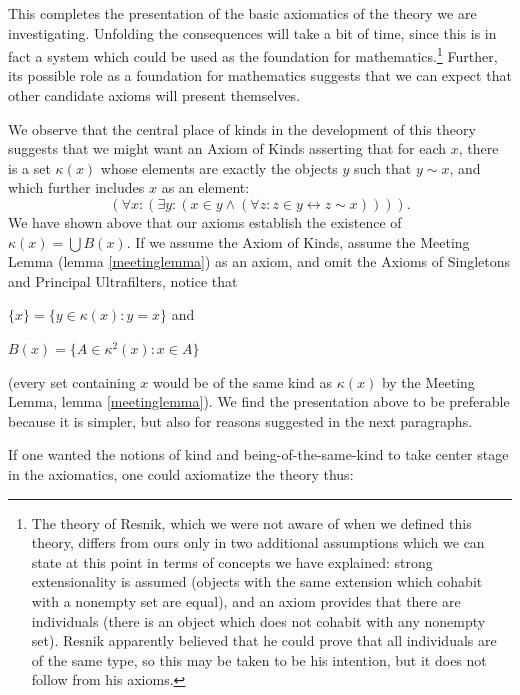 \documentclass[12pt]{article}
\begin{document}
This completes the presentation of the basic axiomatics of the theory we are investigating.  Unfolding the consequences will take a bit of time, since this is in fact a system which could be used as the foundation for mathematics.\footnote{The theory of Resnik, which we were not aware of when we defined this theory, differs from ours only in two additional assumptions which we can state at this point in terms of concepts we have explained:  strong extensionality is assumed (objects with the same extension which cohabit with a nonempty set are equal), and an axiom provides that there are individuals (there is an object which does not cohabit with any nonempty set).  Resnik apparently believed that he could prove that all individuals are of the same type, so this may be taken to be his intention, but it does not follow from his axioms.}  Further, its possible role as a foundation for mathematics suggests that we can expect that other candidate axioms will present themselves.

We observe that the central place of kinds in the development of this
theory suggests that we might want an Axiom of Kinds asserting that
for each $x$, there is a set $\kappa(x)$ whose elements are exactly
the objects $y$ such that $y \sim x$, and which further includes $x$
as an element: $$(\forall x:(\exists y:(x \in y \wedge (\forall z:z
\in y \leftrightarrow z \sim x)))).$$ We have shown above that our
axioms establish the existence of $\kappa(x) = \bigcup B(x)$.  If we
assume the Axiom of Kinds, assume the Meeting Lemma (lemma
\ref{meetinglemma}) as an axiom, and omit the Axioms of Singletons and
Principal Ultrafilters, notice that

$\{x\} = \{y \in \kappa(x):y=x\}$ and

$B(x) = \{A \in \kappa^2(x):x \in A\}$

(every set containing $x$ would be of the same kind as $\kappa(x)$ by
the Meeting Lemma, lemma \ref{meetinglemma}).  We find the presentation
above to be preferable because it is simpler, but also for reasons suggested in
the next paragraphs.
 
 If one wanted the notions of kind and being-of-the-same-kind to take center stage in the axiomatics, one could axiomatize the theory thus:
 
\end{document}
